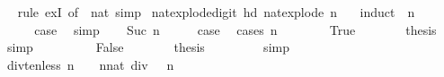 \begin{isabellebody}
%
\isadelimproof
\ \ %
\endisadelimproof
%
\isatagproof
{}\isamarkupfalse%
{\isacharparenleft}{\kern0pt}rule\ exI\ {\isacharbrackleft}{\kern0pt}of\ {\isacharunderscore}{\kern0pt}\ {\isacartoucheopen}{}{\isacharcolon}{\kern0pt}{\isacharcolon}{\kern0pt}nat{\isacartoucheclose}{\isacharbrackright}{\kern0pt}{\isacharcomma}{\kern0pt}\ simp{\isacharparenright}{\kern0pt}%
\endisatagproof
{\isafoldproof}%
%
\isadelimproof
\isanewline
%
\endisadelimproof
\isanewline
{}\isamarkupfalse%
\ nat{\isacharunderscore}{\kern0pt}explode{\isacharprime}{\kern0pt}{\isacharunderscore}{\kern0pt}digit{\isacharcolon}{\kern0pt}\ {\isacartoucheopen}hd\ {\isacharparenleft}{\kern0pt}nat{\isacharunderscore}{\kern0pt}explode{\isacharprime}{\kern0pt}\ n\ {\isacharparenright}{\kern0pt}\ {\isacharless}{\kern0pt}\ {}{}{\isacartoucheclose}\isanewline
%
\isadelimproof
%
\endisadelimproof
%
\isatagproof
{}\isamarkupfalse%
{\isacharparenleft}{\kern0pt}induct\ \ {\isacartoucheopen}n{\isacartoucheclose}{\isacharparenright}{\kern0pt}\isanewline
\ \ \isamarkupfalse%
\ {}\isanewline
\ \ \isamarkupfalse%
\ \isamarkupfalse%
\ {\isacharquery}{\kern0pt}case\ \isamarkupfalse%
\ simp\isanewline
{}\isamarkupfalse%
\isanewline
\ \ \isamarkupfalse%
\ {\isacharparenleft}{\kern0pt}Suc\ n{\isacharparenright}{\kern0pt}\isanewline
\ \ \isamarkupfalse%
\ \isamarkupfalse%
\ {\isacharquery}{\kern0pt}case\ \isamarkupfalse%
\ {\isacharparenleft}{\kern0pt}cases\ {\isacartoucheopen}n\ {\isacharless}{\kern0pt}\ {}{\isacartoucheclose}{\isacharparenright}{\kern0pt}\isanewline
\ \ \ \ \isamarkupfalse%
\ True\isanewline
\ \ \ \ \isamarkupfalse%
\ \isamarkupfalse%
\ {\isacharquery}{\kern0pt}thesis\ \isamarkupfalse%
\ simp\ \isanewline
\ \ \isamarkupfalse%
\isanewline
\ \ \ \ \isamarkupfalse%
\ False\isanewline
\ \ \ \ \isamarkupfalse%
\ \isamarkupfalse%
\ {\isacharquery}{\kern0pt}thesis\ \isanewline
\ \ \ \ \ \ \isamarkupfalse%
\ simp\isanewline
\ \ \isamarkupfalse%
\isanewline
{}\isamarkupfalse%
%
\endisatagproof
{\isafoldproof}%
%
\isadelimproof
\isanewline
%
\endisadelimproof
\isanewline
{}\isamarkupfalse%
\ div{\isacharunderscore}{\kern0pt}ten{\isacharunderscore}{\kern0pt}less{\isacharcolon}{\kern0pt}\ {\isacartoucheopen}n\ {\isasymnoteq}\ {}\ {\isasymLongrightarrow}\ {\isacharparenleft}{\kern0pt}{\isacharparenleft}{\kern0pt}n{\isacharcolon}{\kern0pt}{\isacharcolon}{\kern0pt}nat{\isacharparenright}{\kern0pt}\ div\ {}{}{\isacharparenright}{\kern0pt}\ {\isacharless}{\kern0pt}\ n{\isacartoucheclose}\isanewline

\end{isabellebody}
